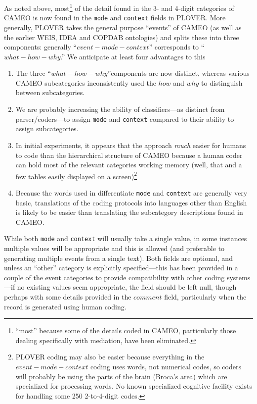 \documentclass[11pt]{report}
\newcommand{\fn}[1]{\footnote{#1}}
\begin{document}
As noted above, most\fn{``most'' because some of the details coded in CAMEO, particularly those dealing specifically with mediation, have been eliminated.} of the detail found in the 3- and 4-digit categories of CAMEO is now found in the \texttt{mode} and  \texttt{context} fields in PLOVER. More generally, PLOVER takes the general purpose ``events'' of CAMEO (as well as the earlier WEIS, IDEA and COPDAB ontologies) and splits these into three components: generally ``$event-mode-context$'' corresponds to ``$what-how-why$.'' We anticipate at least four advantages to this
\begin{enumerate}
\item The three ``$what-how-why$''components are now distinct, whereas various CAMEO subcategories inconsistently used the $how$ and $why$ to distinguish between subcategories.
\item We are probably increasing the ability of classifiers---as distinct from parser/coders---to assign \texttt{mode} and \texttt{context} compared to their ability to assign subcategories.
\item In initial experiments, it appears that the  approach \textit{much} easier for humans to code than the hierarchical structure of CAMEO because a human coder can hold most of the relevant categories working memory (well, that and a few tables easily displayed on a screen)\footnote{PLOVER coding may also be easier because everything in the $event-mode-context$ coding uses words, not numerical codes, so coders will probably be using the parts of the brain (Broca's area) which are specialized for processing words. No known specialized cognitive facility exists for handling some 250 2-to-4-digit codes.}
\item Because the words used in differentiate \texttt{mode} and \texttt{context} are generally very basic, translations of the coding protocols into languages other than English is likely to be easier than translating the subcategory descriptions found in CAMEO. 
\end{enumerate}

While both \texttt{mode} and \texttt{context} will usually take a single value, in some instances multiple values will be appropriate and this is allowed (and preferable to generating multiple events from a single text). Both fields are optional, and unless an ``other'' category is explicitly specified---this has been provided in a couple of the event categories to provide compatibility with other coding systems---if no existing values seem appropriate, the field should be left null, though perhaps with some details provided in the $comment$ field, particularly when the record is generated using human coding.
\end{document}
